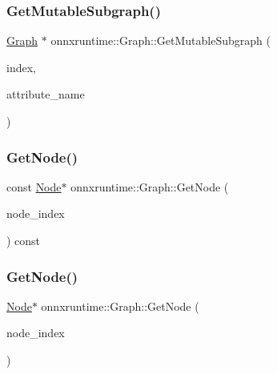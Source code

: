 \mbox{\label{classonnxruntime_1_1Graph_a6627ca765d7547bcd1e5fca2cd53233e}} 
\subsubsection{\texorpdfstring{Get\+Mutable\+Subgraph()}{GetMutableSubgraph()}}
{\footnotesize\ttfamily \mbox{\hyperlink{classonnxruntime_1_1Graph}{Graph}} $\ast$ onnxruntime\+::\+Graph\+::\+Get\+Mutable\+Subgraph (\begin{DoxyParamCaption}\item[{const \mbox{\hyperlink{namespaceonnxruntime_af8773b5c12b5d8fd9292eb2e268df760}{Node\+Index}}}]{index,  }\item[{const std\+::string \&}]{attribute\+\_\+name }\end{DoxyParamCaption})}

\mbox{\label{classonnxruntime_1_1Graph_aec5e2348351170dc20d2c5a14b0a889c}} 
\subsubsection{\texorpdfstring{Get\+Node()}{GetNode()}\hspace{0.1cm}{\footnotesize\ttfamily [1/2]}}
{\footnotesize\ttfamily const \mbox{\hyperlink{classonnxruntime_1_1Node}{Node}}$\ast$ onnxruntime\+::\+Graph\+::\+Get\+Node (\begin{DoxyParamCaption}\item[{\mbox{\hyperlink{namespaceonnxruntime_af8773b5c12b5d8fd9292eb2e268df760}{Node\+Index}}}]{node\+\_\+index }\end{DoxyParamCaption}) const\hspace{0.3cm}{\ttfamily [inline]}}

\mbox{\label{classonnxruntime_1_1Graph_a39d036c40a8ffd4fe06ecbb472b3cfb8}} 
\subsubsection{\texorpdfstring{Get\+Node()}{GetNode()}\hspace{0.1cm}{\footnotesize\ttfamily [2/2]}}
{\footnotesize\ttfamily \mbox{\hyperlink{classonnxruntime_1_1Node}{Node}}$\ast$ onnxruntime\+::\+Graph\+::\+Get\+Node (\begin{DoxyParamCaption}\item[{\mbox{\hyperlink{namespaceonnxruntime_af8773b5c12b5d8fd9292eb2e268df760}{Node\+Index}}}]{node\+\_\+index }\end{DoxyParamCaption})\hspace{0.3cm}{\ttfamily [inline]}}

